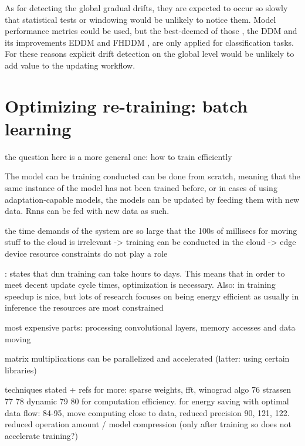 As for detecting the global gradual drifts, they are expected to occur so slowly that statistical tests or windowing would be unlikely to notice them. Model performance metrics could be used, but the best-deemed of those \cite{celikAdaptationStrategiesAutomated2021} \cite{madridAutoMLPresenceDrift2019}, the DDM \cite{gamaLearningDriftDetection2004} and its improvements EDDM \cite{baena-garciaEarlyDriftDetection2006} and FHDDM \cite{pesaranghaderFastHoeffdingDrift2016}, are only applied for classification tasks. For these reasons explicit drift detection on the global level would be unlikely to add value to the updating workflow. 


\section{Optimizing re-training: batch learning}

the question here is a more general one: how to train efficiently

 The model can be training conducted can be done from scratch, meaning that the same instance of the model has not been trained before, or in cases of using adaptation-capable models, the models can be updated by feeding them with new data. Rnns can be fed with new data as such.

the time demands of the system are so large that the 100s of millisecs for moving stuff to the cloud is irrelevant -> training can be conducted in the cloud -> edge device resource constraints do not play a role

\cite{szeEfficientProcessingDeep2017}: %
states that dnn training can take hours to days. This means that in order to meet decent update cycle times, optimization is necessary. Also: in training speedup is nice, but lots of research focuses on being energy efficient as usually in inference the resources are most constrained

most expensive parts: processing convolutional layers, memory accesses and data moving

matrix multiplications can be parallelized and accelerated (latter: using certain libraries)

techniques stated + refs for more: sparse weights, fft, winograd algo 76 strassen 77 78 dynamic 79 80 for computation efficiency. for energy saving with optimal data flow: 84-95, move computing close to data, reduced precision 90, 121, 122. reduced operation amount / model compression (only after training so does not accelerate training?)

